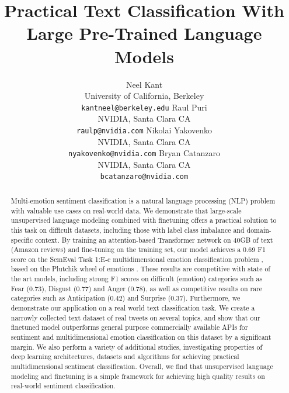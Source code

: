 \documentclass[letterpaper]{article} %
\begin{document}
%
\title{Practical Text Classification With Large Pre-Trained Language Models}
\author{
Neel Kant\\
University of California, Berkeley\\
\texttt{kantneel@berkeley.edu}
\And
Raul Puri\\
NVIDIA, Santa Clara CA\\
\texttt{raulp@nvidia.com}
\And
Nikolai Yakovenko\\
NVIDIA, Santa Clara CA\\
\texttt{nyakovenko@nvidia.com}
\And
Bryan Catanzaro\\
NVIDIA, Santa Clara CA\\
\texttt{bcatanzaro@nvidia.com}
}
\maketitle

\begin{abstract}
Multi-emotion sentiment classification is a natural language processing (NLP) problem with valuable use cases on real-world data. We demonstrate that large-scale unsupervised language modeling combined with finetuning offers a practical solution to this task on difficult datasets, including those with label class imbalance and domain-specific context. By training an attention-based Transformer network \protect\cite{Transformer2017} on 40GB of text (Amazon reviews) \protect\cite{McAuley2015} and fine-tuning on the training set, our model achieves a 0.69 F1 score on the SemEval Task 1:E-c multidimensional emotion classification problem \protect\cite{SemEval2018Task1}, based on the Plutchik wheel of emotions \protect\cite{Plutchik1979}. These results are competitive with state of the art models, including strong F1 scores on difficult (emotion) categories such as Fear (0.73), Disgust (0.77) and Anger (0.78), as well as competitive results on rare categories such as Anticipation (0.42) and Surprise (0.37). Furthermore, we demonstrate our application on a 
real world text classification task. We create a narrowly collected text dataset of real tweets on several topics, and show that our finetuned model outperforms general purpose commercially available APIs for sentiment and multidimensional emotion classification on this dataset by a significant margin.
We also perform a variety of additional studies, investigating properties of deep learning architectures, datasets and algorithms for achieving practical multidimensional sentiment classification. Overall, we find that unsupervised language modeling and finetuning is a simple framework for achieving high quality results on real-world sentiment classification. 

\end{abstract}
\end{document}

